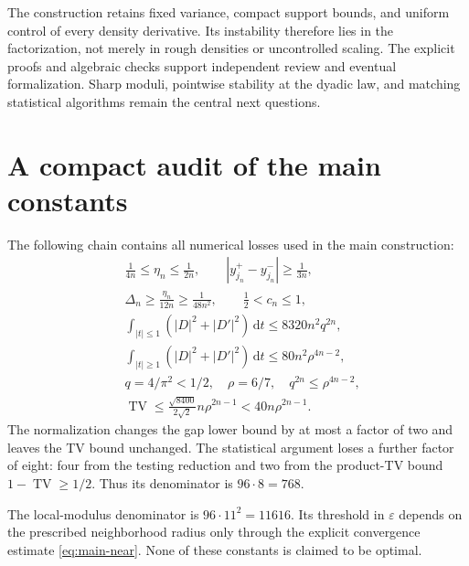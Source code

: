\documentclass[11pt,a4paper]{article}
\theoremstyle{definition}
\theoremstyle{remark}
\DeclareMathOperator{\TV}{TV}
\newcommand{\dd}{\,\mathrm d}
\newcommand{\eps}{\varepsilon}
\begin{document}
The construction retains fixed variance, compact support bounds, and
uniform control of every density derivative. Its instability therefore
lies in the factorization, not merely in rough densities or uncontrolled
scaling. The explicit proofs and algebraic checks support independent
review and eventual formalization. Sharp moduli, pointwise stability at
the dyadic law, and matching statistical algorithms remain the central
next questions.

\clearpage
\appendix
\section{A compact audit of the main constants}
\label{app:constants}

The following chain contains all numerical losses used in the main
construction:
\begin{align*}
 &\frac1{4n}\le\eta_n\le\frac1{2n},\qquad
   |y_{j_n}^+-y_{j_n}^-|\ge\frac1{3n},\\
 &\Delta_n\ge\frac{\eta_n}{12n}\ge\frac1{48n^2},
   \qquad\frac12<c_n\le1,\\
 &\int_{|t|\le1}(|D|^2+|D'|^2)\dd t\le8320n^2q^{2n},\\
 &\int_{|t|\ge1}(|D|^2+|D'|^2)\dd t\le80n^2\rho^{4n-2},\\
 &q=4/\pi^2<1/2,\quad\rho=6/7,\quad
   q^{2n}\le\rho^{4n-2},\\
 &\TV\le\frac{\sqrt{8400}}{2\sqrt2}n\rho^{2n-1}
                       <40n\rho^{2n-1}.
\end{align*}
The normalization changes the gap lower bound by at most a factor of two
and leaves the TV bound unchanged. The statistical argument loses a
further factor of eight: four from the testing reduction and two from
the product-TV bound $1-\TV\ge1/2$. Thus its denominator is
$96\cdot8=768$.

The local-modulus denominator is $96\cdot11^2=11616$. Its threshold in
$\eps$ depends on the prescribed neighborhood radius only through the
explicit convergence estimate \eqref{eq:main-near}. None of these
constants is claimed to be optimal.
\end{document}
